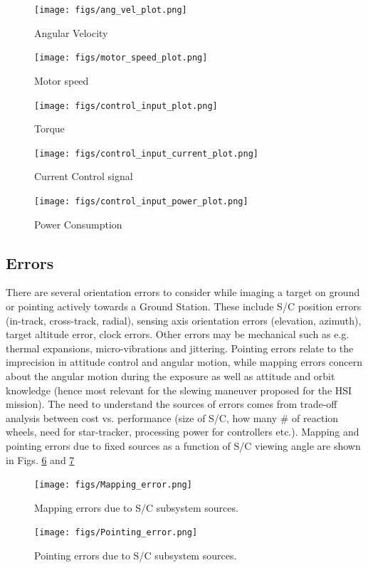     \begin{figure}[htbp]
        \centering
        \texttt{[image: figs/ang\_vel\_plot.png]}
				\caption{Angular Velocity}
				\label{fig:ang_vel_plot}
    \end{figure}
		
		\begin{figure}[htbp]
        \centering
        \texttt{[image: figs/motor\_speed\_plot.png]}
				\caption{Motor speed}
				\label{fig:motor_speed_plot}
    \end{figure}
				\begin{figure}[htbp]
        \centering
        \texttt{[image: figs/control\_input\_plot.png]}
				\caption{Torque}
				\label{fig:control_input_plot}
    \end{figure}
		
			\begin{figure}[htbp]
        \centering
        \texttt{[image: figs/control\_input\_current\_plot.png]}
				\caption{Current Control signal}
				\label{fig:control_input_plot_voltage}
    \end{figure}
				\begin{figure}[htbp]
        \centering
        \texttt{[image: figs/control\_input\_power\_plot.png]}
				\caption{Power Consumption}
				\label{fig:control_input_plot_power}
    \end{figure}
\subsection{Errors}
There are several orientation errors to consider while imaging a target on ground or pointing actively towards a Ground Station. These include S/C position errors (in-track, cross-track, radial), sensing axis orientation errors (elevation, azimuth), target altitude error, clock errors. Other errors may be mechanical such as e.g. thermal expansions, micro-vibrations and jittering. Pointing errors relate to the imprecision in attitude control and angular motion, while mapping errors concern about the angular motion during the exposure as well as attitude and orbit knowledge (hence most relevant for the slewing maneuver proposed for the HSI mission). The need to understand the sources of errors comes from trade-off analysis between cost vs. performance (size of S/C, how many \# of reaction wheels, need for star-tracker, processing power for controllers etc.). Mapping and pointing errors due to fixed sources as a function of S/C viewing angle are shown in Figs. \ref{fig:mappingerror} and \ref{fig:pointingerror}
\begin{figure}[htbp]
  \centering
    \texttt{[image: figs/Mapping\_error.png]}
    \caption{Mapping errors due to S/C subsystem sources.}
    \label{fig:mappingerror}
\end{figure}
\begin{figure}[htbp]
  \centering
    \texttt{[image: figs/Pointing\_error.png]}
    \caption{Pointing errors due to S/C subsystem sources.}
    \label{fig:pointingerror}
\end{figure}